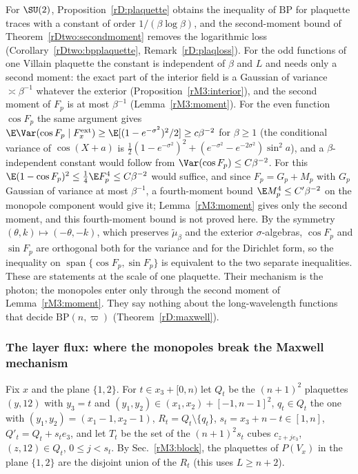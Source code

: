 \begin{remark}\label{rM3:plaqremark}
For $\SU(2)$, Proposition~\ref{rD:plaquette} obtains the inequality of
$\mathrm{BP}$ for plaquette traces with a constant of order
$1/(\beta\log\beta)$, and the second-moment bound of
Theorem~\ref{rDtwo:secondmoment} removes the logarithmic loss
(Corollary~\ref{rDtwo:bpplaquette}, Remark~\ref{rD:plaqloss}). For the odd
functions of one Villain plaquette the constant is independent of $\beta$
and $L$ and needs only a second moment: the
exact part of the interior field is a Gaussian of variance $\asymp\beta^{-1}$
whatever the exterior (Proposition~\ref{rM3:interior}), and the second
moment of $F_p$ is at most $\beta^{-1}$ (Lemma~\ref{rM3:moment}). For the
even function $\cos F_p$ the same argument gives $\E\Var(\cos F_p\mid
F^{\rm ext}_x)\ge\E[(1-e^{-\sigma^2})^2/2]\ge c\beta^{-2}$ for $\beta\ge1$
(the conditional variance of $\cos(X+a)$ is $\frac12(1-e^{-\sigma^2})^2+
(e^{-\sigma^2}-e^{-2\sigma^2})\sin^2a$), and a $\beta$-independent constant
would follow from $\Var(\cos F_p)\le C\beta^{-2}$. For this
$\E(1-\cos F_p)^2\le\frac14\E F_p^4\le C\beta^{-2}$ would suffice, and
since $F_p=G_p+M_p$ with $G_p$ Gaussian of variance at most $\beta^{-1}$, a
fourth-moment bound $\E M_p^4\le C'\beta^{-2}$ on the monopole component
would give it; Lemma~\ref{rM3:moment} gives only the second moment, and
this fourth-moment bound is not proved here. By the
symmetry $(\theta,k)\mapsto(-\theta,-k)$, which preserves $\tilde\mu_\beta$
and the exterior $\sigma$-algebras, $\cos F_p$ and $\sin F_p$ are
orthogonal both for the variance and for the Dirichlet form, so the
inequality on $\operatorname{span}\{\cos F_p,\sin F_p\}$ is equivalent to
the two separate inequalities. These are statements at the scale of one
plaquette. Their mechanism is the photon; the monopoles enter only
through the second moment of Lemma~\ref{rM3:moment}. They say
nothing about the long-wavelength functions that decide
$\mathrm{BP}(n,\varpi)$ (Theorem~\ref{rD:maxwell}).
\end{remark}

\subsubsection{The layer flux: where the monopoles break the Maxwell
mechanism}\label{rM3:layersec}

Fix $x$ and the plane $\{1,2\}$. For $t\in x_3+[0,n)$ let $Q_t$ be the
$(n+1)^2$ plaquettes $(y,12)$ with $y_3=t$ and $(y_1,y_2)\in(x_1,x_2)+[-1,
n-1]^2$, $q_t\in Q_t$ the one with $(y_1,y_2)=(x_1-1,x_2-1)$, $R_t=Q_t
\setminus\{q_t\}$, $s_t=x_3+n-t\in[1,n]$, $Q'_t=Q_t+s_te_3$, and let $T_t$ be
the set of the $(n+1)^2s_t$ cubes $c_{z+je_3}$, $(z,12)\in Q_t$, $0\le j<s_t$.
By Sec.~\ref{rM3:block}, the plaquettes of $P(V_x)$ in the plane $\{1,2\}$
are the disjoint union of the $R_t$ (this uses $L\ge n+2$).

